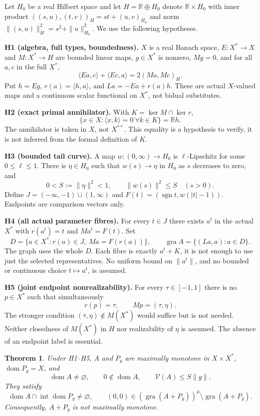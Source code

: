 \documentclass[11pt,a4paper]{article}
\newtheorem{theorem}{Theorem}
\begin{document}
Let $H_0$ be a real Hilbert space and let $H=\mathbb R\oplus H_0$ denote $\mathbb R\times H_0$ with inner product $((s,u),(t,v))_H=st+(u,v)_{H_0}$ and norm $\|(s,u)\|_H^2=s^2+\|u\|_{H_0}^2$. We use the following hypotheses.

\textbf{H1 (algebra, full types, boundedness).} $X$ is a real Banach space, $E:X^*\to X$ and $M:X^*\to H$ are bounded linear maps, $g\in X^*$ is nonzero, $Mg=0$, and for all $a,c$ in the full $X^*$,
\[
\langle Ea,c\rangle+\langle Ec,a\rangle=2(Ma,Mc)_H.
\tag{H1}
\]
Put $h=Eg$, $r(a)=\langle h,a\rangle$, and $La=-Ea+r(a)h$. These are actual $X$-valued maps and a continuous scalar functional on $X^*$, not bidual substitutes.

\textbf{H2 (exact primal annihilator).} With $K=\ker M\cap\ker r$,
\[
\{x\in X:\langle x,k\rangle=0\ \forall k\in K\}=\mathbb Rh.
\tag{H2}
\]
The annihilator is taken in $X$, not $X^{**}$. This equality is a hypothesis to verify, it is not inferred from the formal definition of $K$.

\textbf{H3 (bounded tail curve).} A map $w:(0,\infty)\to H_0$ is $\ell$-Lipschitz for some $0\le\ell\le1$. There is $\eta\in H_0$ such that $w(s)\to\eta$ in $H_0$ as $s$ decreases to zero, and
\[
0<S:=\|\eta\|^2<1,\qquad \|w(s)\|^2\le S\quad(s>0).
\tag{H3}
\]
Define $J=(-\infty,-1)\cup(1,\infty)$ and $F(t)=(\operatorname{sgn}t,w(|t|-1))$. Endpoints are comparison vectors only.

\textbf{H4 (all actual parameter fibres).} For every $t\in J$ there exists $a^t$ in the actual $X^*$ with $r(a^t)=t$ and $Ma^t=F(t)$. Set
\[
D=\{a\in X^*:r(a)\in J,\ Ma=F(r(a))\},\qquad
\operatorname{gra}A=\{(La,a):a\in D\}.
\tag{H4}
\]
The graph uses the whole $D$. Each fibre is exactly $a^t+K$, it is not enough to use just the selected representatives. No uniform bound on $\|a^t\|$, and no bounded or continuous choice $t\mapsto a^t$, is assumed.

\textbf{H5 (joint endpoint nonrealizability).} For every $\tau\in[-1,1]$ there is no $p\in X^*$ such that simultaneously
\[
r(p)=\tau,\qquad Mp=(\tau,\eta).
\tag{H5}
\]
The stronger condition $(\tau,\eta)\notin M(X^*)$ would suffice but is not needed. Neither closedness of $M(X^*)$ in $H$ nor realizability of $\eta$ is assumed. The absence of an endpoint label is essential.

\begin{theorem}\label{thm:construction}
Under H1--H5, $A$ and $P_g$ are maximally monotone in $X\times X^*$, $\operatorname{dom}P_g=X$, and
\[
\operatorname{dom}A\ne\varnothing,\qquad
0\notin\operatorname{dom}A,\qquad
\mathcal V(A)\le S\|g\|.
\]
They satisfy
\[
\operatorname{dom}A\cap\operatorname{int}\operatorname{dom}P_g\ne\varnothing,
\qquad
(0,0)\in(\operatorname{gra}(A+P_g))^\mu\setminus\operatorname{gra}(A+P_g).
\]
Consequently, $A+P_g$ is not maximally monotone.
\end{theorem}
\end{document}
